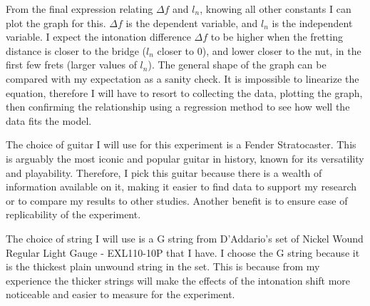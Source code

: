 From the final expression relating $\Delta f$ and $l_n$, knowing all other constants I can plot the graph for this. $\Delta f$ is the dependent variable, and $l_n$ is the independent variable. I expect the intonation difference $\Delta f$ to be higher when the fretting distance is closer to the bridge ($l_n$ closer to 0), and lower closer to the nut, in the first few frets (larger values of $l_n$). The general shape of the graph can be compared with my expectation as a sanity check. It is impossible to linearize the equation, therefore I will have to resort to collecting the data, plotting the graph, then confirming the relationship using a regression method to see how well the data fits the model.

The choice of guitar I will use for this experiment is a Fender Stratocaster. This is arguably the most iconic and popular guitar in history, known for its versatility and playability. Therefore, I pick this guitar because there is a wealth of information available on it, making it easier to find data to support my research or to compare my results to other studies. Another benefit is to ensure ease of replicability of the experiment. 

The choice of string I will use is a G string from D'Addario's set of Nickel Wound Regular Light Gauge - EXL110-10P that I have. I choose the G string because it is the thickest plain unwound string in the set. This is because from my experience the thicker strings will make the effects of the intonation shift more noticeable and easier to measure for the experiment. 